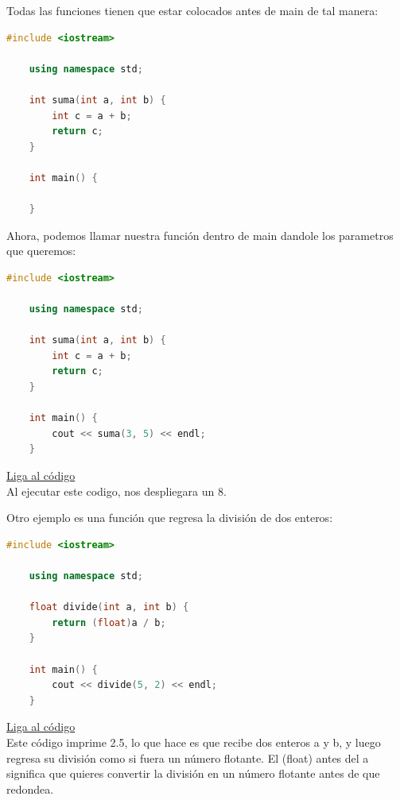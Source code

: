 \documentclass{article}
\begin{document}
Todas las funciones tienen que estar colocados antes de main de tal manera:

\begin{lstlisting}[language=C++, caption=Función de suma]
    #include <iostream>

    using namespace std;
    
    int suma(int a, int b) {
        int c = a + b;
        return c;
    }

    int main() {

    }
\end{lstlisting}

Ahora, podemos llamar nuestra función dentro de main dandole los parametros que queremos:

\begin{lstlisting}[language=C++, caption=Función de suma]
    #include <iostream>

    using namespace std;
    
    int suma(int a, int b) {
        int c = a + b;
        return c;
    }

    int main() {
        cout << suma(3, 5) << endl;
    }
\end{lstlisting}
\href{https://repl.it/@Jamesscn/Funciones}{Liga al código}\\

Al ejecutar este codigo, nos despliegara un 8.

Otro ejemplo es una función que regresa la división de dos enteros:

\begin{lstlisting}[language=C++, caption=Función de división]
    #include <iostream>

    using namespace std;
    
    float divide(int a, int b) {
        return (float)a / b;
    }

    int main() {
        cout << divide(5, 2) << endl;
    }
\end{lstlisting}
\href{https://repl.it/@Jamesscn/Funciones}{Liga al código}\\

Este código imprime 2.5, lo que hace es que recibe dos enteros a y b, y luego regresa su división como si fuera un número flotante. El (float) antes del a significa que quieres convertir la división en un número flotante antes de que redondea.
\end{document}
